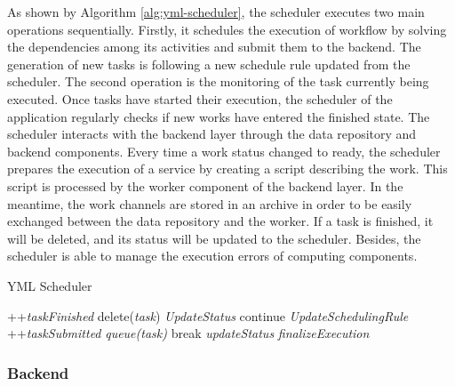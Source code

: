 As shown by Algorithm \ref{alg:yml-scheduler}, the scheduler executes two main operations sequentially. Firstly, it schedules the execution of workflow by solving the dependencies among its activities and submit them to the backend. The generation of new tasks is following a new schedule rule updated from the scheduler.  The second operation is the monitoring of the task currently being executed. Once tasks have started their execution, the scheduler of the application regularly checks if new works have entered the finished state. The scheduler interacts with the backend layer through the data repository and backend components. Every time a work status changed to ready, the scheduler prepares the execution of a service by creating a script describing the work. This script is processed by the worker component of the backend layer. In the meantime, the work channels are stored in an archive in order to be easily exchanged between the data repository and the worker. If a task is finished, it will be deleted, and its status will be updated to the scheduler. Besides, the scheduler is able to manage the execution errors of computing components. 

\begin{algorithm}[t]{}
	\caption{YML Scheduler}   
	\label{alg:yml-scheduler}   
	\begin{algorithmic}[1]
				\State ++\textit{taskFinished}
				\State delete(\textit{task})
			\EndWhile
			\State \textit{UpdateStatus}
				\State continue 
			\EndIf 
			\State \textit{UpdateSchedulingRule}
				\State ++\textit{taskSubmitted}
				\State \textit{queue(task)}
			\EndWhile
				\State break 
			\EndIf
			\State \textit{updateStatus}
		\EndWhile
		\State \textit{finalizeExecution}
	\end{algorithmic}  
\end{algorithm}

\subsubsection{Backend}

